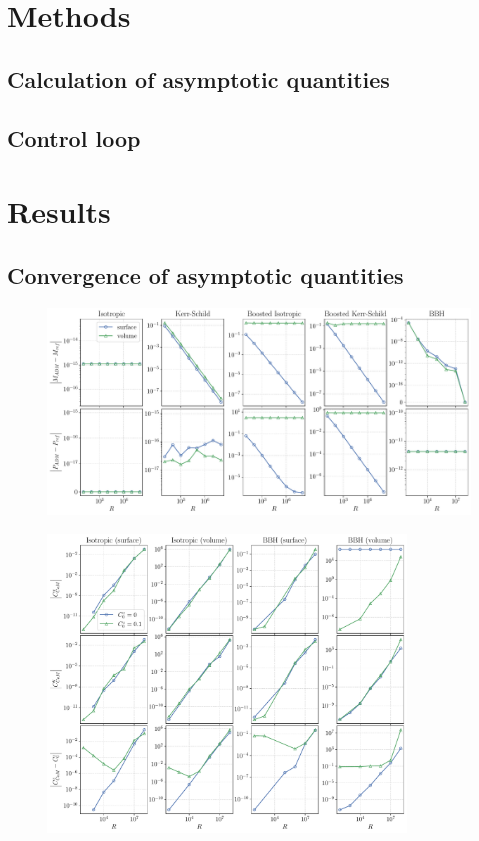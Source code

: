 \documentclass{../document}
\begin{document}
  \section{Methods}
  
    \subsection{Calculation of asymptotic quantities}

    \subsection{Control loop}
  
  \section{Results}

    \subsection{Convergence of asymptotic quantities}

      \begin{figure}
        \centering
        \includegraphics[width=\textwidth]{../../plots/final_report/distance_convergence_Madm_Padm.pdf}
        \caption{}
      \end{figure}

      \begin{figure}
        \centering
        \includegraphics[width=0.85\textwidth]{../../plots/final_report/distance_convergence_CoM.pdf}
        \caption{}
      \end{figure}
\end{document}
